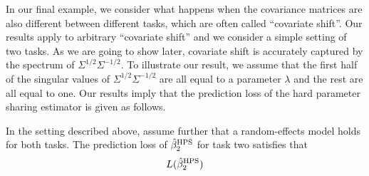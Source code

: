 \begin{example}\label{sec_covshift}
In our final example, we consider what happens when the covariance matrices are also different between different tasks, which are often called ``covariate shift''.
Our results apply to arbitrary ``covariate shift'' and we consider a simple setting of two tasks.
As we are going to show later, covariate shift is accurately captured by the spectrum of $\Sigma^{1/2}\Sigma^{-1/2}$.
To illustrate our result, we assume that the first half of the singular values of $\Sigma^{1/2}\Sigma^{-1/2}$ are all equal to a parameter $\lambda$ and the rest are all equal to one.
Our results imply that the prediction loss of the hard parameter sharing estimator is given as follows.

\begin{corollary}\label{prop_covariate}
	In the setting described above, assume further that a random-effects model holds for both tasks.
	The prediction loss of $\hat{\beta}_2^{\textup{HPS}}$ for task two satisfies that
	\begin{align*}
		L(\hat{\beta}_2^{\textup{HPS}})
	\end{align*}
\end{corollary}


\end{example}
